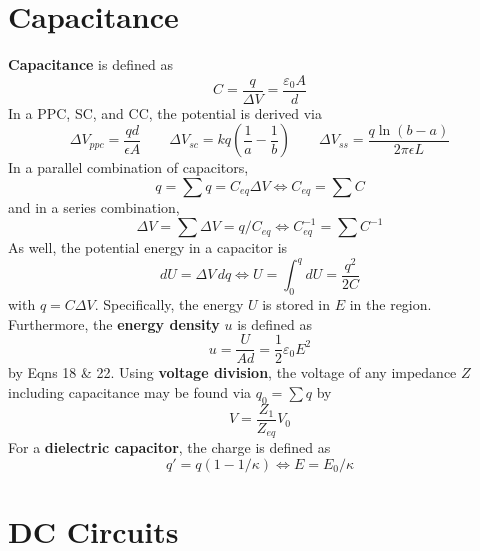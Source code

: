 \documentclass{tufte-book}
\begin{document}
\section{Capacitance}
\textbf{Capacitance} is defined as \begin{equation}
  C = \frac{q}{\Delta V} = \frac{\varepsilon_0 A}{d}
\end{equation}
In a PPC, SC, and CC, the potential is derived via \begin{equation}
  \Delta V_{ppc} = \frac{qd}{\epsilon A} \qquad \Delta V_{sc} =kq \left(\frac{1}{a} - \frac{1}{b} \right) \qquad \Delta V_{ss} = \frac{q \ln (b-a)}{2 \pi \epsilon L}
\end{equation}
In a parallel combination of capacitors, \begin{equation}
  q = \sum q  = C_{eq} \Delta V \iff  C_{eq} = \sum C
\end{equation}
and in a series combination, \begin{equation}
  \Delta V = \sum \Delta V = q/C_{eq} \iff C_{eq}^{-1} = \sum C^{-1}
\end{equation}
As well, the potential energy in a capacitor is \begin{equation}
  dU = \Delta V \, dq \iff U = \int_0^q dU = \frac{q^2}{2C}
\end{equation}
with $q = C \Delta V$. Specifically, the energy $U$ is stored in $E$ in the region. Furthermore, the \textbf{energy density} $u$ is defined as \begin{equation}
  u = \frac{U}{Ad} = \textstyle\frac{1}{2} \varepsilon_0 E^2
\end{equation}
by Eqns 18 \& 22. Using \textbf{voltage division}, the voltage of any impedance $Z$ including capacitance may be found via $q_0 = \sum q$ by \begin{equation}
  V = \frac{Z_1}{Z_{eq}} V_0
\end{equation}
For a \textbf{dielectric capacitor}, the charge is defined as \begin{equation}
  q' = q (1 - 1/\kappa) \iff E = E_0/\kappa
\end{equation}

\section{DC Circuits}
\end{document}
